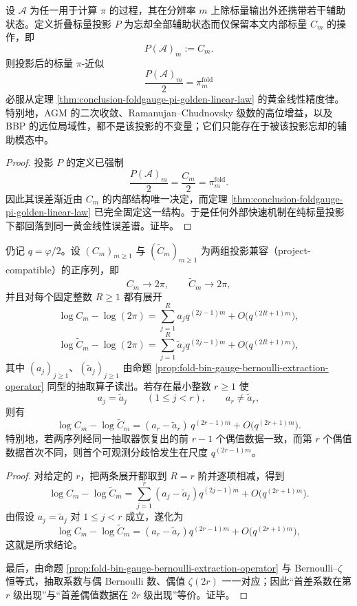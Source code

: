\begin{proposition}[经典加速机制在折叠标量投影下的坍缩]\label{prop:conclusion-foldgauge-classical-pi-collapse}
设 \(\mathcal A\) 为任一用于计算 \(\pi\) 的过程，其在分辨率 \(m\) 上除标量输出外还携带若干辅助状态。定义折叠标量投影 \(P\) 为忘却全部辅助状态而仅保留本文内部标量 \(C_m\) 的操作，即
\[
P(\mathcal A)_m:=C_m.
\]
则投影后的标量 \(\pi\)-近似
\[
\frac{P(\mathcal A)_m}{2}
=
\pi_m^{\mathrm{fold}}
\]
必服从定理 \ref{thm:conclusion-foldgauge-pi-golden-linear-law} 的黄金线性精度律。特别地，AGM 的二次收敛、Ramanujan--Chudnovsky 级数的高位增益，以及 BBP 的远位局域性，都不是该投影的不变量；它们只能存在于被该投影忘却的辅助模态中。
\end{proposition}
\begin{proof}
投影 \(P\) 的定义已强制
\[
\frac{P(\mathcal A)_m}{2}=\frac{C_m}{2}=\pi_m^{\mathrm{fold}}.
\]
因此其误差渐近由 \(C_m\) 的内部结构唯一决定，而定理 \ref{thm:conclusion-foldgauge-pi-golden-linear-law} 已完全固定这一结构。于是任何外部快速机制在纯标量投影下都回落到同一黄金线性误差谱。证毕。
\end{proof}

\begin{theorem}\label{thm:conclusion-foldgauge-pi-evenzeta-first-difference}
仍记 \(q=\varphi/2\)。设 \((C_m)_{m\ge 1}\) 与 \((\widetilde C_m)_{m\ge 1}\) 为两组投影兼容（project-compatible）的正序列，即
\[
C_m\to 2\pi,
\qquad
\widetilde C_m\to 2\pi,
\]
并且对每个固定整数 \(R\ge 1\) 都有展开
\[
\log C_m-\log(2\pi)
=
\sum_{j=1}^{R}a_j q^{(2j-1)m}
+O\!\bigl(q^{(2R+1)m}\bigr),
\]
\[
\log \widetilde C_m-\log(2\pi)
=
\sum_{j=1}^{R}\widetilde a_j q^{(2j-1)m}
+O\!\bigl(q^{(2R+1)m}\bigr),
\]
其中 \((a_j)_{j\ge 1}\)、\((\widetilde a_j)_{j\ge 1}\) 由命题 \ref{prop:fold-bin-gauge-bernoulli-extraction-operator} 同型的抽取算子读出。若存在最小整数 \(r\ge 1\) 使
\[
a_j=\widetilde a_j\qquad (1\le j<r),
\qquad
a_r\neq \widetilde a_r,
\]
则有
\[
\log C_m-\log \widetilde C_m
=
(a_r-\widetilde a_r)\,q^{(2r-1)m}
+O\!\bigl(q^{(2r+1)m}\bigr).
\]
特别地，若两序列经同一抽取器恢复出的前 \(r-1\) 个偶值数据一致，而第 \(r\) 个偶值数据首次不同，则首个可观测分歧恰发生在尺度 \(q^{(2r-1)m}\)。
\end{theorem}
\begin{proof}
对给定的 \(r\)，把两条展开都取到 \(R=r\) 阶并逐项相减，得到
\[
\log C_m-\log \widetilde C_m
=
\sum_{j=1}^{r}(a_j-\widetilde a_j)q^{(2j-1)m}
+O\!\bigl(q^{(2r+1)m}\bigr).
\]
由假设 \(a_j=\widetilde a_j\) 对 \(1\le j<r\) 成立，遂化为
\[
\log C_m-\log \widetilde C_m
=
(a_r-\widetilde a_r)q^{(2r-1)m}
+O\!\bigl(q^{(2r+1)m}\bigr),
\]
这就是所求结论。

最后，由命题 \ref{prop:fold-bin-gauge-bernoulli-extraction-operator} 与 Bernoulli--\(\zeta\) 恒等式，抽取系数与偶 Bernoulli 数、偶值 \(\zeta(2r)\) 一一对应；因此“首差系数在第 \(r\) 级出现”与“首差偶值数据在 \(2r\) 级出现”等价。证毕。
\end{proof}

